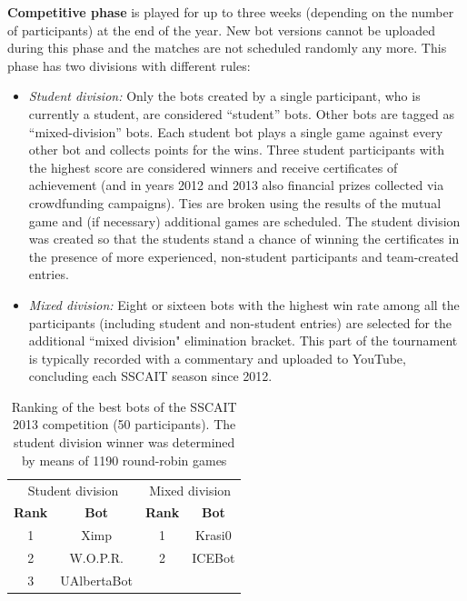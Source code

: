 \documentclass{llncs}
\begin{document}
\textbf{{Competitive phase}} is played for up to three weeks (depending on the number of participants) at the end of the year. New bot versions cannot be uploaded during this phase and the matches are not scheduled randomly any more. This phase has two divisions with different rules:
	\begin{itemize}
      \item {\em Student division:} Only the bots created by a single participant, who is currently a student, are considered ``student'' bots. Other bots are tagged as ``mixed-division'' bots. Each student bot plays a single game against every other bot and collects points for the wins. Three student participants with the highest score are considered winners and receive  certificates of achievement (and in years 2012 and 2013 also financial prizes collected via crowdfunding campaigns). Ties are broken using the results of the mutual game and (if necessary) additional games are scheduled. The student division was created so that the students stand a chance of winning the certificates in the presence of more experienced, non-student participants and team-created entries.
      \item {\em Mixed division:} Eight or sixteen bots with the highest win rate among all the participants (including student and non-student entries) are selected for the additional ``mixed division" elimination bracket. This part of the tournament is typically recorded with a commentary and uploaded to YouTube, concluding each SSCAIT season since 2012. 
    \end{itemize}


\begin{table}[!t]
\caption{Ranking of the best bots of the SSCAIT 2013 competition (50 participants).
The student division winner was determined by means of 1190 round-robin games}
\label{tab:sscait2013}
\centering
\begin{tabular}{|c|c|c|c|}
\hline
\multicolumn{2}{|c|}{Student division} & \multicolumn{2}{|c|}{Mixed division}\\
{\bfseries Rank} & {\bfseries Bot} & {\bfseries Rank} & {\bfseries Bot} \\
\hline
1 & Ximp & 1 & Krasi0 \\
2 & W.O.P.R.  & 2 & ICEBot \\
3 & UAlbertaBot 			&   &  \\
\hline
\end{tabular}
\end{table}
\end{document}
